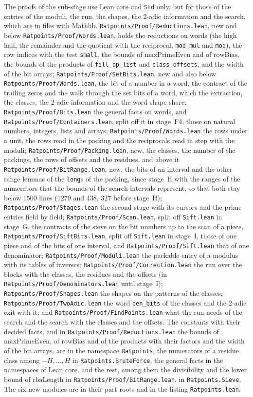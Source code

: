 The proofs of the sub-stage use Lean core and \verb|Std| only, but for those of the entries of the
moduli, the run, the shapes, the 2-adic information and the search, which are in files with Mathlib.
\verb|Ratpoints/Proof/Reductions.lean|, new and below \verb|Ratpoints/Proof/Words.lean|, holds the
reductions on words (the high half, the remainder and the quotient with the reciprocal,
\verb|mod_mul| and \verb|mod|), the row indices with the test \verb|small|, the bounds of
$\mathrm{maxPrimeEven}$ and of $\mathrm{rowBias}$, the bounds of the products of \verb|fill_bp_list|
and \verb|class_offsets|, and the width of the bit arrays; \verb|Ratpoints/Proof/SetBits.lean|, new
and also below \verb|Ratpoints/Proof/Words.lean|, the bit of a number in a word, the contract of the
trailing zeros and the walk through the set bits of a word, which the extraction, the classes, the
2-adic information and the word shape share; \verb|Ratpoints/Proof/Bits.lean| the general facts on
words, and \verb|Ratpoints/Proof/Containers.lean|, split off it in stage~F4, those on natural
numbers, integers, lists and arrays; \verb|Ratpoints/Proof/Words.lean| the rows under a unit, the
rows read in the packing and the reciprocals read in step with the moduli;
\verb|Ratpoints/Proof/Packing.lean|, new, the classes, the number of the packings, the rows of
offsets and the residues, and above it \verb|Ratpoints/Proof/BitRange.lean|, new, the bits of an
interval and the other range lemmas of the \verb|long|s of the packing, since stage~H with the
ranges of the numerators that the bounds of the search intervals represent, so that both stay below
$1500$ lines ($1279$ and $438$, $327$ before stage~H); \verb|Ratpoints/Proof/Stages.lean| the second
stage with its cursors and the prime entries field by field; \verb|Ratpoints/Proof/Scan.lean|, split
off \verb|Sift.lean| in stage~G, the contracts of the sieve on the bit numbers up to the scan of a
piece, \verb|Ratpoints/Proof/SiftBits.lean|, split off \verb|Sift.lean| in stage~I, those of one
piece and of the bits of one interval, and \verb|Ratpoints/Proof/Sift.lean| that of one denominator;
\verb|Ratpoints/Proof/Moduli.lean| the packable entry of a modulus with its tables of inverses;
\verb|Ratpoints/Proof/Correction.lean| the run over the blocks with the classes, the residues and
the offsets (in \verb|Ratpoints/Proof/Denominators.lean| until stage~I);
\verb|Ratpoints/Proof/Shapes.lean| the shapes on the patterns of the classes;
\verb|Ratpoints/Proof/TwoAdic.lean| the word \verb|den_bits| of the classes and the 2-adic exit with
it; and \verb|Ratpoints/Proof/FindPoints.lean| what the run needs of the search and the search with
the classes and the offsets. The constants with their decided facts, and in
\verb|Ratpoints/Proof/Reductions.lean| the bounds of $\mathrm{maxPrimeEven}$, of $\mathrm{rowBias}$
and of the products with their factors and the width of the bit arrays, are in the namespace
\verb|Ratpoints|, the numerators of a residue class among $-H, \dots, H$ in
\verb|Ratpoints.BruteForce|, the general facts in the namespaces of Lean core, and the rest, among
them the divisibility and the lower bound of $\mathrm{rbaLength}$ in
\verb|Ratpoints/Proof/BitRange.lean|, in \verb|Ratpoints.Sieve|. The six new modules are in their
part roots and in the listing \verb|Ratpoints.lean|.

